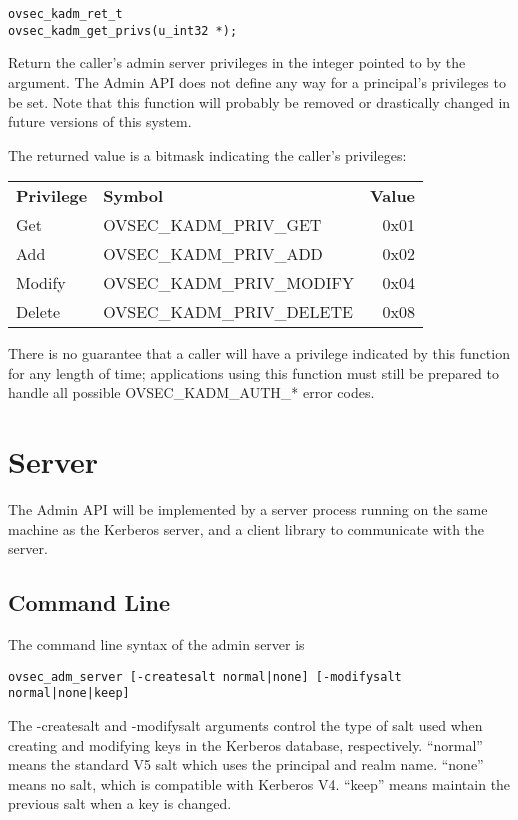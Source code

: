 \begin{verbatim}
ovsec_kadm_ret_t
ovsec_kadm_get_privs(u_int32 *);
\end{verbatim}

Return the caller's admin server privileges in the integer pointed to
by the argument.  The Admin API does not define any way for a
principal's privileges to be set.  Note that this function will
probably be removed or drastically changed in future versions of this
system.

The returned value is a bitmask indicating the caller's privileges:

\begin{tabular}{llr}
{\bf Privilege} & {\bf Symbol} & {\bf Value} \\
Get & OVSEC_KADM_PRIV_GET & 0x01 \\
Add & OVSEC_KADM_PRIV_ADD & 0x02 \\
Modify & OVSEC_KADM_PRIV_MODIFY & 0x04 \\
Delete & OVSEC_KADM_PRIV_DELETE & 0x08
\end{tabular}

There is no guarantee that a caller will have a privilege indicated by
this function for any length of time; applications using this function
must still be prepared to handle all possible OVSEC_KADM_AUTH_* error
codes.

\section{Server}

The Admin API will be implemented by a server process running on the
same machine as the Kerberos server, and a client library to
communicate with the server.

\subsection{Command Line}
\label{sec:commandline}

The command line syntax of the admin server is

\begin{verbatim}
ovsec_adm_server [-createsalt normal|none] [-modifysalt normal|none|keep]
\end{verbatim}

The -createsalt and -modifysalt arguments control the type of salt
used when creating and modifying keys in the Kerberos database,
respectively.  ``normal'' means the standard V5 salt which uses the
principal and realm name.  ``none'' means no salt, which is compatible
with Kerberos V4.  ``keep'' means maintain the previous salt when a
key is changed.

